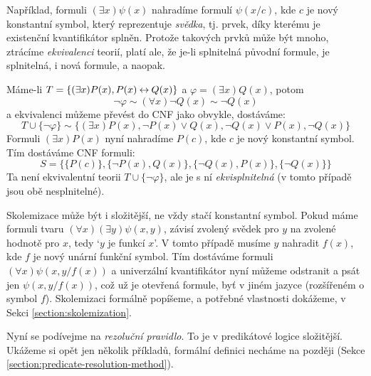 Například, formuli $(\exists x)\psi(x)$ nahradíme formulí $\psi(x/c)$, kde $c$ je nový konstantní symbol, který reprezentuje \emph{svědka}, tj. prvek, díky kterému je existenční kvantifikátor splněn. Protože takových prvků může být mnoho, ztrácíme \emph{ekvivalenci} teorií, platí ale, že je-li splnitelná původní formule, je splnitelná, i nová formule, a naopak.

\begin{example}
  Máme-li $T=\{(\exists x)P(x),P(x)\mathbin{\leftrightarrow} Q(x)\}$ a $\varphi=(\exists x)Q(x)$, potom 
  $$
  \neg\varphi\sim(\forall x)\neg Q(x)\sim\neg Q(x)
  $$
  a ekvivalenci můžeme převést do CNF jako obvykle, dostáváme:
  $$
  T\cup\{\neg \varphi\}\sim\{(\exists x)P(x),\neg P(x)\lor Q(x),\neg Q(x)\lor P(x),\neg Q(x)\}
  $$
  Formuli $(\exists x)P(x)$ nyní nahradíme $P(c)$, kde $c$ je nový konstantní symbol. Tím dostáváme CNF formuli:
  $$
  S = \{\{P(c)\},\{\neg P(x),Q(x)\},\{\neg Q(x),P(x)\},\{\neg Q(x)\}\}
  $$
  Ta není ekvivalentní teorii $T\cup\{\neg \varphi\}$, ale je s ní \emph{ekvisplnitelná} (v tomto případě jsou obě nesplnitelné).
\end{example}

Skolemizace může být i složitější, ne vždy stačí konstantní symbol. Pokud máme formuli tvaru $(\forall x)(\exists y)\psi(x,y)$, závisí zvolený svědek pro $y$ na zvolené hodnotě pro $x$, tedy `$y$ je funkcí $x$'. V tomto případě musíme $y$ nahradit $f(x)$, kde $f$ je nový unární funkční symbol. Tím dostáváme formuli $(\forall x)\psi(x,y/f(x))$ a univerzální kvantifikátor nyní můžeme odstranit a psát jen $\psi(x,y/f(x))$, což už je otevřená formule, byť v jiném jazyce (rozšířeném o symbol $f$). Skolemizaci formálně popíšeme, a potřebné vlastnosti dokážeme, v Sekci \ref{section:skolemization}. 

Nyní se podívejme na \emph{rezoluční pravidlo}. To je v predikátové logice složitější. Ukážeme si opět jen několik příkladů, formální definici necháme na později (Sekce \ref{section:predicate-resolution-method}).

